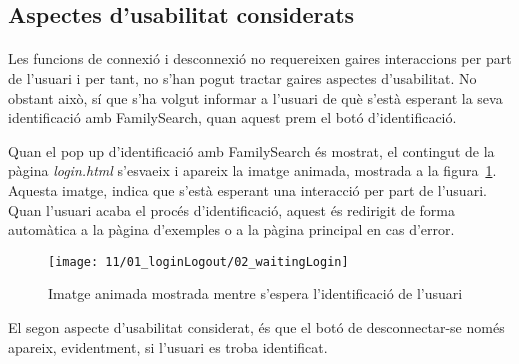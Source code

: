 \subsection{Aspectes d'usabilitat considerats}

    \paragraph{}
    Les funcions de connexió i desconnexió no requereixen gaires interaccions per part de l'usuari i per tant, no s'han pogut tractar gaires aspectes d'usabilitat. No obstant això, sí que s'ha volgut informar a l'usuari de què s'està esperant la seva identificació amb FamilySearch, quan aquest prem el botó d'identificació.

    Quan el pop up d'identificació amb FamilySearch és mostrat, el contingut de la pàgina \emph{login.html} s'esvaeix i apareix la imatge animada, mostrada a la figura~\ref{fig:fsLoginWait}. Aquesta imatge, indica que s'està esperant una interacció per part de l'usuari. Quan l'usuari acaba el procés d'identificació, aquest és redirigit de forma automàtica a la pàgina d'exemples o a la pàgina principal en cas d'error.

    \begin{figure}[h]
        \texttt{[image: 11/01\_loginLogout/02\_waitingLogin]}
        \centering
        \caption{Imatge animada mostrada mentre s'espera l'identificació de l'usuari}\label{fig:fsLoginWait}
    \end{figure}

    El segon aspecte d'usabilitat considerat, és que el botó de desconnectar-se només apareix, evidentment, si l'usuari es troba identificat.
